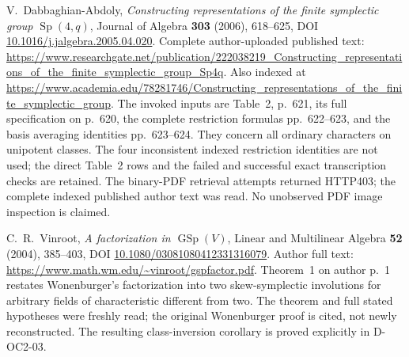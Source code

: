 V.~Dabbaghian-Abdoly,
\emph{Constructing representations of the finite symplectic group
$\operatorname{Sp}(4,q)$}, Journal of Algebra \textbf{303} (2006),
618--625, DOI \href{https://doi.org/10.1016/j.jalgebra.2005.04.020}
{10.1016/j.jalgebra.2005.04.020}.
Complete author-uploaded published text:
\url{https://www.researchgate.net/publication/222038219_Constructing_representations_of_the_finite_symplectic_group_Sp4q}.
Also indexed at
\url{https://www.academia.edu/78281746/Constructing_representations_of_the_finite_symplectic_group}.
The invoked inputs are Table~2, p.~621, its full specification on
p.~620, the complete restriction formulas pp.~622--623, and the
basis averaging identities pp.~623--624. They concern all ordinary
characters on unipotent classes. The four inconsistent indexed
restriction identities are not used; the direct Table~2 rows and
the failed and successful exact transcription checks are retained.
The binary-PDF retrieval attempts returned HTTP403; the complete
indexed published author text was read. No unobserved PDF image
inspection is claimed.

C.~R.~Vinroot, \emph{A factorization in $\operatorname{GSp}(V)$},
Linear and Multilinear Algebra \textbf{52} (2004), 385--403,
DOI \href{https://doi.org/10.1080/03081080412331316079}
{10.1080/03081080412331316079}.
Author full text:
\url{https://www.math.wm.edu/~vinroot/gspfactor.pdf}.
Theorem~1 on author p.~1 restates Wonenburger's factorization into
two skew-symplectic involutions for arbitrary fields of characteristic
different from two. The theorem and full stated hypotheses were
freshly read; the original Wonenburger proof is cited, not newly
reconstructed. The resulting class-inversion corollary is proved
explicitly in D-OC2-03.

